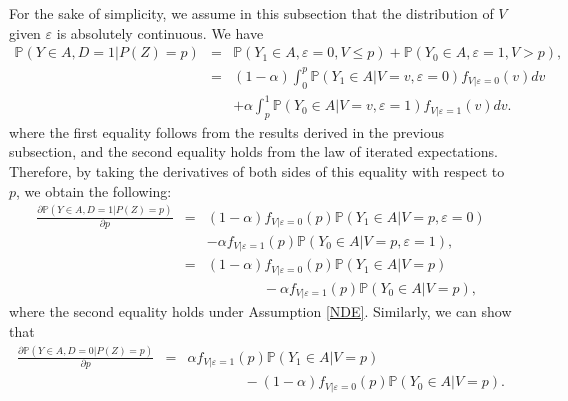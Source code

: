 \documentclass[11pt,reqno]{amsart}
\theoremstyle{plain}
\numberwithin{equation}{section}
\begin{document}
For the sake of simplicity, we assume in this subsection that the distribution of $V$ given $\varepsilon$ is absolutely continuous. We have 
\begin{eqnarray}
\mathbb P(Y\in A, D=1 \vert P(Z)=p)  &=& \mathbb P(Y_1\in A, \varepsilon=0, V \leq p) + \mathbb P(Y_0\in A, \varepsilon=1, V > p),\nonumber \\
&=& (1-\alpha) \int^{p}_0\mathbb P\left(Y_1\in A \vert V=v, \varepsilon =0\right)f_{V\vert \varepsilon=0}(v)dv\nonumber \\
&& + \alpha \int_{p}^1\mathbb P\left(Y_0\in A \vert V=v, \varepsilon =1\right)f_{V\vert \varepsilon=1}(v)dv. \label{eq:main}
\end{eqnarray}
where the first equality follows from the results derived in the previous subsection, and the second equality holds from the law of iterated expectations.
Therefore, by taking the derivatives of both sides of this equality with respect to $p$, we obtain the following:
\begin{eqnarray}
\frac{\partial \mathbb P(Y\in A, D=1 \vert P(Z)=p) }{\partial p}
&=& (1-\alpha) f_{V\vert \varepsilon=0}(p) \mathbb P\left(Y_1\in A \vert V=p, \varepsilon =0\right) \nonumber\\
&& - \alpha f_{V\vert \varepsilon=1}(p) \mathbb P\left(Y_0\in A \vert V=p, \varepsilon =1\right), \nonumber\\
&=& (1-\alpha) f_{V\vert \varepsilon=0}(p) \mathbb P\left(Y_1\in A \vert V=p\right) \nonumber\\
&&\qquad \qquad- \alpha f_{V\vert \varepsilon=1}(p) \mathbb P\left(Y_0\in A \vert V=p\right), \label{eq:mte1}
\end{eqnarray}
where the second equality holds under Assumption \ref{NDE}.
Similarly, we can show that 
\begin{eqnarray}
\frac{\partial \mathbb P(Y\in A, D=0 \vert P(Z)=p) }{\partial p} &=&  \alpha f_{V\vert \varepsilon=1}(p) \mathbb P\left(Y_1\in A \vert V=p\right) \nonumber\\
&& \qquad \qquad  - (1-\alpha) f_{V\vert \varepsilon=0}(p) \mathbb P\left(Y_0\in A \vert V=p\right). \label{eq:mte2}
\end{eqnarray}
\end{document}
